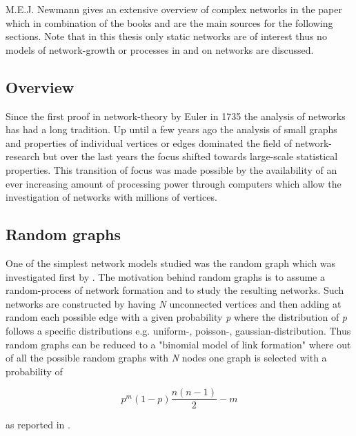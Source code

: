 \documentclass[../Bachelorarbeit.tex]{subfiles}
\begin{document}
M.E.J. Newmann gives an extensive overview of complex networks in the paper \cite{Newman_ComplexNetworks} which in combination of the books \cite{Jackson2008} and \cite{Easley2010} are the main sources for the following sections. Note that in this thesis only static networks are of interest thus no models of network-growth or processes in and on networks are discussed.

\subsection{Overview}
Since the first proof in network-theory by Euler in 1735 the analysis of networks has had a long tradition. Up until a few years ago the analysis of small graphs and properties of individual vertices or edges dominated the field of network-research but over the last years the focus shifted towards large-scale statistical properties. This transition of focus was made possible by the availability of an ever increasing amount of processing power through computers which allow the investigation of networks with millions of vertices.

\subsection{Random graphs}
One of the simplest network models studied was the random graph which was investigated first by \cite{ErdosRenyi1959}. The motivation behind random graphs is to assume a random-process of network formation and to study the resulting networks. Such networks are constructed by having \textit{N} unconnected vertices and then adding at random each possible edge with a given probability \textit{p} where the distribution of \textit{p} follows a specific distributions e.g. uniform-, poisson-, gaussian-distribution. Thus random graphs can be reduced to a "binomial model of link formation" \cite{Jackson2008} where out of all the possible random graphs with \textit{N} nodes one graph is selected with a probability of 

\begin{equation}
p^m(1-p) \frac{n(n-1)}{2} - m
\end{equation}

as reported in \cite{Jackson2008}.
\end{document}
